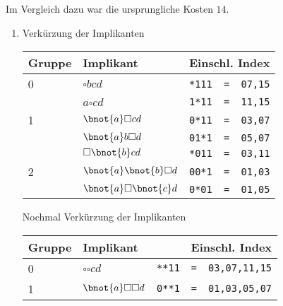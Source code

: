 \begin{enumerate}[label={[OH\arabic*]},start=8]
        Im Vergleich dazu war die ursprungliche Kosten $14$.
    \item 
        \begin{enumerate}
            \item Verkürzung der Implikanten
                \begin{center}
                    \begin{tabular}{llllr}
                        \toprule
                        Gruppe & Implikant & \multicolumn{3}{r}{Einschl. Index} \\
                        \midrule
                        0 & $\square bcd$ & \texttt{*111} & \texttt{=} & \texttt{07,15}\\
                          & $a\square cd$ & \texttt{1*11} & \texttt{=} & \texttt{11,15}\\
                        1 & $\bnot{a}\square cd$ & \texttt{0*11} & \texttt{=} & \texttt{03,07}\\
                          & $\bnot{a}b\square d$ & \texttt{01*1} & \texttt{=} & \texttt{05,07}\\
                          & $\square \bnot{b}cd$ & \texttt{*011} & \texttt{=} & \texttt{03,11}\\
                        2 & $\bnot{a}\bnot{b}\square d$ & \texttt{00*1} & \texttt{=} & \texttt{01,03}\\
                          & $\bnot{a}\square\bnot{c}d$ & \texttt{0*01} & \texttt{=} & \texttt{01,05}\\
                        \bottomrule
                    \end{tabular}
                \end{center}
                Nochmal Verkürzung der Implikanten
                \begin{center}
                    \begin{tabular}{llllr}
                        \toprule
                        Gruppe & Implikant & \multicolumn{3}{r}{Einschl. Index} \\
                        \midrule
                        0 & $\square \square cd$ & \texttt{**11} & \texttt{=} & \texttt{03,07,11,15} \\
                        1 & $\bnot{a}\square\square d$ & \texttt{0**1} & \texttt{=} & \texttt{01,03,05,07} \\
                        \bottomrule
                    \end{tabular}
                \end{center}

\end{enumerate}
\end{enumerate}
